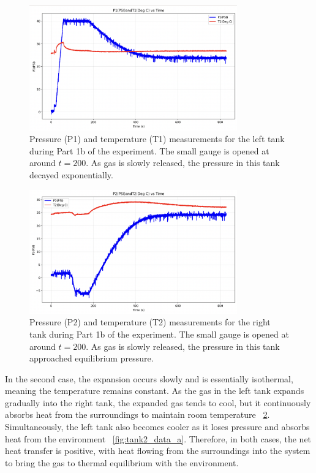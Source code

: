 \documentclass[12pt]{article}
\begin{document}
\begin{figure}[h!]
\centering
\includegraphics[width=0.8\textwidth]{1b-left_tank.png}
\caption{Pressure (P1) and temperature (T1) measurements for the left tank during Part 1b of the experiment. The small gauge is opened at around $t=200$. As gas is slowly released, the pressure in this tank decayed exponentially.}
\label{fig:tank1_data_b}
\end{figure}

\begin{figure}[h!]
\centering
\includegraphics[width=0.8\textwidth]{1b-right_tank.png}
\caption{Pressure (P2) and temperature (T2) measurements for the right tank during Part 1b of the experiment. The small gauge is opened at around $t=200$. As gas is slowly released, the pressure in this tank approached equilibrium pressure.}
\label{fig:tank2_data_b}
\end{figure}

In the second case, the expansion occurs slowly and is essentially isothermal, meaning the temperature remains constant. As the gas in the left tank expands gradually into the right tank, the expanded gas tends to cool, but it continuously absorbs heat from the surroundings to maintain room temperature ~\ref{fig:tank2_data_b}. Simultaneously, the left tank also becomes cooler as it loses pressure and absorbs heat from the environment ~\ref{fig:tank2_data_a}. Therefore, in both cases, the net heat transfer is positive, with heat flowing from the surroundings into the system to bring the gas to thermal equilibrium with the environment.
\end{document}
